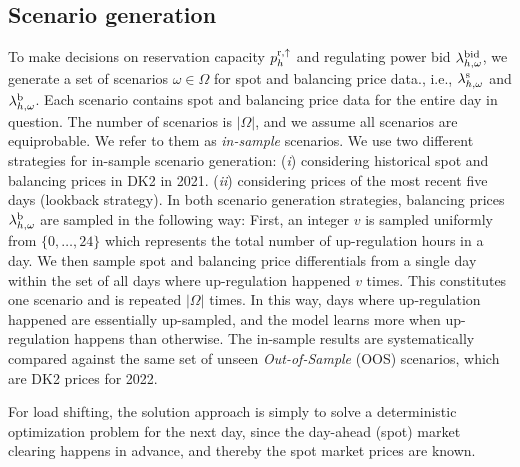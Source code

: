\documentclass[11pt,a4paper]{article}
\begin{document}
\subsection{Scenario generation}\label{sec:scenario_generation}
To make decisions on reservation capacity $p_{h}^{\rm{r},\uparrow}$ and regulating power bid $\lambda_{h,\omega}^{\rm{bid}}$, we generate a set of scenarios $\omega \in \Omega$ for spot and balancing price data., i.e., $ \lambda_{h,\omega}^{\rm{s}}$ and $ \lambda_{h,\omega}^{\rm{b}}$. Each scenario contains spot and balancing price data for the entire day in question. The number of scenarios is $|\Omega|$, and we assume all scenarios are equiprobable. We refer to them as \textit{in-sample} scenarios. We use two different strategies for in-sample scenario generation: (\textit{i}) considering historical spot and balancing prices in DK2 in 2021.
(\textit{ii}) considering prices of the most recent five days (lookback strategy). In both scenario generation strategies, balancing prices $\lambda_{h,\omega}^{\rm{b}}$ are sampled in the following way: First, an integer $v$ is sampled uniformly from $\{0, \ldots, 24\}$ which represents the total number of up-regulation hours in a day. We then sample spot and balancing price differentials from a single day within the set of all days where up-regulation happened $v$ times. This constitutes one scenario and is repeated $|\Omega|$ times. In this way, days where up-regulation happened are essentially up-sampled, and the model learns more when up-regulation happens than otherwise. The in-sample results are systematically compared against the same set of unseen \textit{Out-of-Sample} (OOS) scenarios, which are DK2 prices for 2022.

For load shifting, the solution approach is simply to solve a deterministic optimization problem for the next day, since the day-ahead (spot) market clearing happens in advance, and thereby the spot market prices are known.
\end{document}
